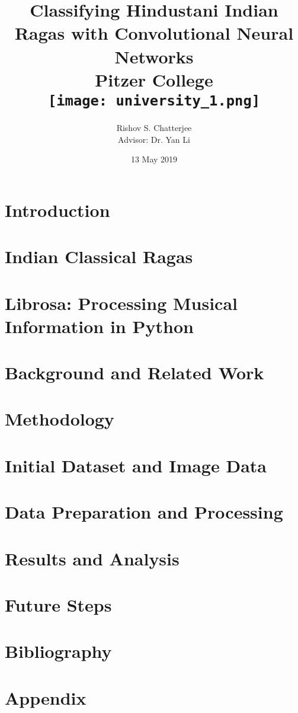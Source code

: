 \documentclass[12pt]{report}
\title{
{Classifying Hindustani Indian Ragas with Convolutional Neural Networks}\\
{\large Pitzer College}\\
{\texttt{[image: university\_1.png]}}
}
\author{Rishov S. Chatterjee\\[1cm]{Advisor: Dr. Yan Li}}
\date{13 May 2019}
\begin{document}
\maketitle{}



\chapter*{\centering Introduction}


\chapter*{\centering Indian Classical Ragas}


\chapter*{\centering Librosa: Processing Musical Information in Python}


\chapter*{\centering Background and Related Work}


\chapter*{\centering Methodology}


\chapter*{\centering Initial Dataset and Image Data}


\chapter*{\centering Data Preparation and Processing}


\chapter*{\centering Results and Analysis}


\chapter*{\centering Future Steps}


\chapter*{\centering Bibliography}


\chapter*{\centering Appendix}

\end{document}
